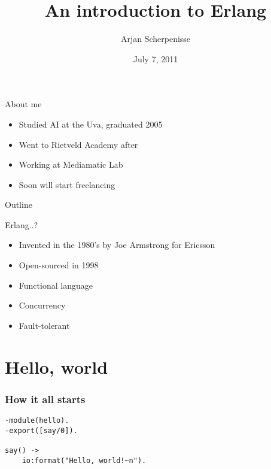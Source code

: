 \documentclass{beamer}
\title[Erlang: introduction] %
{An introduction to Erlang}
\author{Arjan Scherpenisse}
\date{July 7, 2011}
\begin{document}
\lstset{language=erlang,
        numbers=left,
        numberstyle=\tiny,
        showstringspaces=false,
        aboveskip=-40pt,
        frame=leftline,
        escapechar=\#
        }


\begin{frame}
  \titlepage
\end{frame}

\begin{frame}{About me}
  \begin{itemize}
  \item Studied AI at the Uva, graduated 2005
  \item Went to Rietveld Academy after
  \item Working at Mediamatic Lab
  \item Soon will start freelancing
  \end{itemize}
\end{frame}

\begin{frame}{Outline}
  \tableofcontents
\end{frame}

\begin{frame}{Erlang..?}
  \begin{itemize}
  \item Invented in the 1980's by Joe Armstrong for Ericsson
  \item Open-sourced in 1998
  \item Functional language
  \item Concurrency
  \item Fault-tolerant
  \end{itemize}

\end{frame}


\section{Hello, world}

\begin{frame}[fragile]
\frametitle{How it all starts}
  \begin{semiverbatim}
    \begin{lstlisting}
-module(hello).
-export([say/0]).

say() ->
    io:format("Hello, world!~n").
    \end{lstlisting}
  \end{semiverbatim}
\end{frame}
\end{document}
